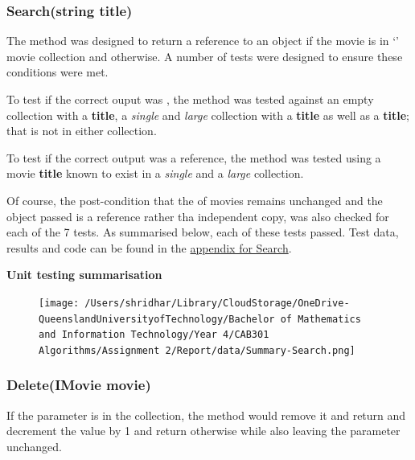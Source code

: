 \documentclass[a4paper]{article}
\begin{document}
\subsubsection{Search{(string title)}}
The  method was designed to return a reference to an  object if the movie is in `' movie collection and  otherwise. A number of tests were designed to ensure these conditions were met.
\vspace{3mm}

\noindent
To test if the correct ouput was , the method was tested against an empty collection with a  \textbf{title}, a \textit{single} and \textit{large} collection with a  \textbf{title} as well as a \textbf{title}; that is not in either collection. 
\vspace{3mm}

\noindent
To test if the correct output was a reference, the method was tested using a movie \textbf{title} known to exist in a \textit{single} and a \textit{large} collection.
\vspace{1mm}

\noindent
Of course, the post-condition that the  of movies remains unchanged and the object passed is a reference rather tha independent copy, was also checked for each of the 7 tests. As summarised below, each of these tests passed. Test data, results and code can be found in the \hyperlink{subsubsection.5.2.4}{appendix for Search}.
\vspace{2mm}

\noindent
\textbf{Unit testing summarisation}
\begin{figure}[H]
   \texttt{[image: /Users/shridhar/Library/CloudStorage/OneDrive-QueenslandUniversityofTechnology/Bachelor of Mathematics and Information Technology/Year 4/CAB301 Algorithms/Assignment 2/Report/data/Summary-Search.png]}
\end{figure}

\subsubsection{Delete{(IMovie movie)}}
If the parameter  is in the collection, the  method would remove it and return  and decrement the  value by 1 and return  otherwise while also leaving the  parameter unchanged.
\vspace{1mm}
\end{document}
